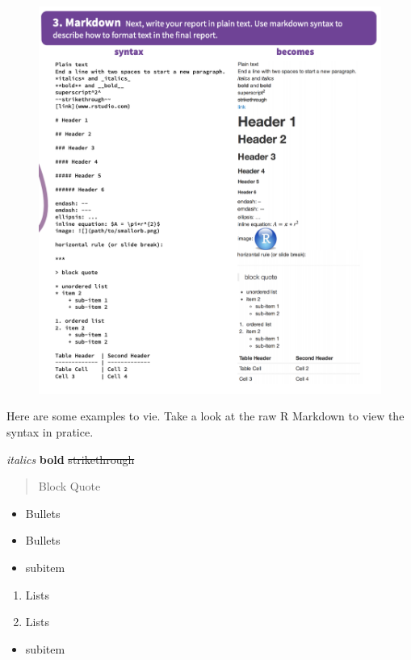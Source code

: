 \documentclass[]{book}
\providecommand{\tightlist}{%
  \setlength{\itemsep}{0pt}\setlength{\parskip}{0pt}}
\begin{document}
\begin{figure}
\centering
\includegraphics{images/syntax.png}
\caption{}
\end{figure}

Here are some examples to vie. Take a look at the raw R Markdown to view
the syntax in pratice.

\emph{italics} \textbf{bold} \sout{strikethrough}

\begin{quote}
Block Quote
\end{quote}

\begin{itemize}
\tightlist
\item
  Bullets
\item
  Bullets
\item
  subitem
\end{itemize}

\begin{enumerate}
\def\labelenumi{\arabic{enumi}.}
\tightlist
\item
  Lists
\item
  Lists
\end{enumerate}

\begin{itemize}
\tightlist
\item
  subitem
\end{itemize}
\end{document}
